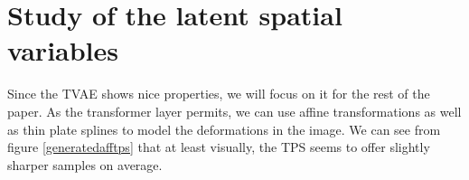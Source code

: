 \documentclass[letterpaper, twoside]{article}
\begin{document}



\section{Study of the latent spatial variables}

  Since the TVAE shows nice properties, we will focus on it for the rest of the paper. As the transformer layer \cite{Jaderberg.stn} permits, we can use affine transformations as well as thin plate splines to model the deformations in the image. We can see from figure \ref{generatedafftps} that at least visually, the TPS seems to offer slightly sharper samples on average.\\
\end{document}
